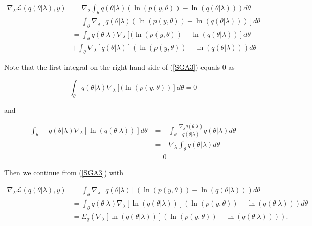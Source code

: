 \documentclass{article}\usepackage[]{graphicx}\usepackage[]{color}
\numberwithin{equation}{section}
\begin{document}
\begin{align}
\nabla_{\lambda} \mathcal{L}(q(\theta | \lambda), y) &=  \nabla_{\lambda} \int_{\theta} q(\theta | \lambda) \left( \ln (p(y, \theta)) - \ln(q(\theta | \lambda)) \right) d\theta \nonumber \\
&=   \int_{\theta} \nabla_{\lambda}[  q(\theta | \lambda) \left( \ln (p(y, \theta)) - \ln(q(\theta | \lambda)) \right)] d\theta \label{SGA2} \\
&=  \int_{\theta}  q(\theta | \lambda) \nabla_{\lambda}[( \ln (p(y, \theta)) - \ln(q(\theta | \lambda))] d\theta \nonumber \\ 
&+ \int_{\theta} \nabla_{\lambda} [q(\theta | \lambda)] \left( \ln (p(y, \theta)) - \ln(q(\theta | \lambda)) \right) d\theta \label{SGA3}
\end{align}

Note that the first integral on the right hand side of (\ref{SGA3}) equals 0 as

\begin{equation}
\int_{\theta}  q(\theta | \lambda) \nabla_{\lambda}[( \ln (p(y, \theta))] d\theta = 0
\end{equation}

and

\begin{align}
\int_{\theta} - q(\theta | \lambda) \nabla_{\lambda}[ \ln(q(\theta | \lambda))] d\theta &= - \int_{\theta} \frac{\nabla_{\lambda}q(\theta | \lambda)}{q(\theta | \lambda)} q(\theta | \lambda) d\theta \nonumber \\
&=  -  \nabla_{\lambda}\int_{\theta} q(\theta | \lambda) d\theta \nonumber \\
&=  0 \nonumber
\end{align}

Then we continue from (\ref{SGA3}) with 

\begin{align}
\nabla_{\lambda} \mathcal{L}(q(\theta | \lambda), y) &=  \int_{\theta} \nabla_{\lambda} [q(\theta | \lambda)] \left( \ln (p(y, \theta)) - \ln(q(\theta | \lambda)) \right) d\theta \nonumber \\
&=   \int_{\theta} q(\theta | \lambda)  \nabla_{\lambda} [\ln(q(\theta | \lambda))]\left( \ln (p(y, \theta)) - \ln(q(\theta | \lambda)) \right)d\theta \nonumber \\
&= E_q \left(  \nabla_{\lambda} [\ln(q(\theta | \lambda))]\left( \ln (p(y, \theta)) - \ln(q(\theta | \lambda)) \right) \right). \label{SGA4}
\end{align}
\end{document}
